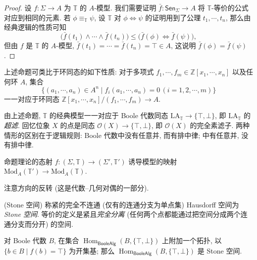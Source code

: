 \begin{proof}
	设 $f\colon \Sigma\to A$ 为 $\mathbb T$ 的 $A$-模型. 我们需要证明 $\bar f\colon \mathsf {Sen}_\Sigma\to A$ 将 $\mathbb T$-等价的公式对应到相同的元素. 若 $\phi \equiv_{\mathbb T} \psi$, 设 $\mathbb T$ 对 $\phi \Leftrightarrow\psi$ 的证明用到了公理 $t_1,\cdots,t_n$, 那么由经典逻辑的性质可知
	$$
	\big( \bar f(t_1) \land \cdots \land \bar f (t_n) \big) \leq \big( \bar f(\phi) \Leftrightarrow \bar f(\psi) \big),
	$$
	但由 $f$ 是 $\mathbb T$ 的 $A$-模型, $\bar f(t_1)=\cdots = \bar f(t_n) = \top\in A$, 这说明 $\bar f(\phi) = \bar f(\psi)$.
\end{proof}

\begin{remark}
	{}
	上述命题可类比于环同态的如下性质:
	对于多项式 $f_1,\cdots,f_m\in \mathbb{Z}[x_1,\cdots,x_n]$ 以及任何环 $A$, 集合
	$$
	\big\{
	(a_1,\cdots,a_n)\in A^n\mid f_i(a_1,\cdots,a_n)=0\,(i=1,2,\cdots,m)
	\big\}
	$$
	一一对应于环同态 $\mathbb{Z}[x_1,\cdots,x_n]/(f_1,\cdots,f_m) \to A$.
\end{remark}

\begin{remark}
	[label={model-and-ultrafilter}]
	{}
	由上述命题, $\mathbb T$ 的经典模型一一对应于 Boole 代数同态 $\text{LA}_{\mathbb T} \to \{\top,\bot\}$, 即 $\text{LA}_{\mathbb T}$ 的\emph{超滤}.
	回忆位象 $X$ 的点是\fm{}同态 $\mathcal O(X) \to \{\top,\bot\}$, 即 $\mathcal O(X)$ 的完全素滤子. 两种情形的区别在于逻辑规则: Boole 代数中没有任意并, 而有排中律; \fm{}中有任意并, 没有排中律.
\end{remark}

\begin{prop}
	{}
	命题理论的态射 $f\colon (\Sigma,\mathbb T) \to (\Sigma',\mathbb T')$ 诱导模型的映射 $\text{Mod}_A(\mathbb T') \to \text{Mod}_A(\mathbb T)$.
\end{prop}

注意方向的反转 (这是代数--几何对偶的一部分).

\begin{definition}
	{(Stone 空间)}
	称紧的完全不连通 (仅有的连通分支为单点集) Hausdorff 空间为 \emph{Stone 空间}. 等价的定义是紧且\emph{完全分离} (任何两个点都能通过把空间分成两个连通分支而分开) 的空间.
\end{definition}

\begin{propdef}
	{}
	对 Boole 代数 $B$, 在集合 $\operatorname{Hom}_{\mathsf {BooleAlg}}(B,\{\top,\bot\})$ 上附加一个拓扑, 以 $\{b\in B\mid f(b)=\top\}$ 为开集基; 那么 $\operatorname{Hom}_{\mathsf {BooleAlg}}(B,\{\top,\bot\})$ 是 Stone 空间.
\end{propdef}

